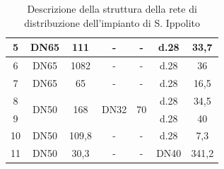 \documentclass[laurea,oneside,11pt]{USiena_tesiLM}
\begin{document}
\begin{table}[!ht]
{\begin{tabular}{|c|c|c|c|c|c|c|}
5                                             & DN65                  & 111                                    & -                         & -                     & d.28         & 33,7                      \\ \hline
6                                             & DN65                  & 1082                                   & -                         & -                     & d.28         & 36                        \\ \hline
7                                             & DN65                  & 65                                     & -                         & -                     & d.28         & 16,5                      \\ \hline
8                                             & \multirow{2}{*}{DN50} & \multirow{2}{*}{168}                   & \multirow{2}{*}{DN32}     & \multirow{2}{*}{70}   & d.28         & 34,5                      \\ \cline{1-1} \cline{6-7} 
9                                             &                       &                                        &                           &                       & d.28         & 40                        \\ \hline
10                                            & DN50                  & 109,8                                  & -                         & -                     & d.28         & 7,3                       \\ \hline
11                                            & DN50                  & 30,3                                   & -                         & -                     & DN40         & 341,2                     \\ \hline
\end{tabular}}
\caption{Descrizione della struttura della rete di distribuzione dell'impianto di S. Ippolito}
\label{tab:rete_ippolito}
\end{table}
\end{document}
